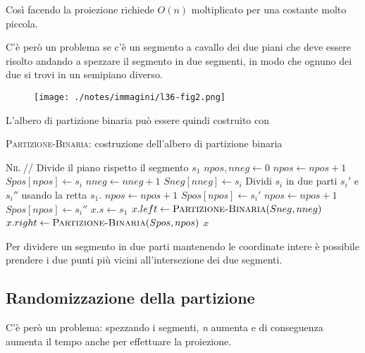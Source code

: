 Così facendo la proiezione richiede $O(n)$ moltiplicato per una costante molto piccola.

C'è però un problema se c'è un segmento a cavallo dei due piani che deve essere risolto andando a spezzare il segmento in due segmenti, in modo che ognuno dei due si trovi in un semipiano diverso.

\begin{figure}[htbp]
\centering
\texttt{[image: ./notes/immagini/l36-fig2.png]}
\end{figure}

L'albero di partizione binaria può essere quindi costruito con

\begin{breakablealgorithm}
	\caption{\textsc{Partizione-Binaria}: costruzione dell'albero di partizione binaria}
	\begin{algorithmic}[1]
        \State \Return \textsc{Nil}
    \EndIf
    \State // Divide il piano rispetto il segmento $s_1$
    \State $npos, nneg \gets 0$
            \State $npos \gets npos+1$
            \State $Spos[npos] \gets s_i$
            \State $nneg \gets nneg+1$
            \State $Sneg[nneg] \gets s_i$
        \Else
            \State Dividi $s_i$ in due parti $s_i'$ e $s_i''$ usando la retta $s_1$.
            \State $npos \gets npos+1$
            \State $Spos[npos] \gets s_i'$
            \State $npos \gets npos+1$
            \State $Spos[npos] \gets s_i''$
        \EndIf
    \EndFor
    \State $x.s \gets s_1$
    \State $x.left \gets \textsc{Partizione-Binaria}(Sneg, nneg)$
    \State $x.right \gets \textsc{Partizione-Binaria}(Spos, npos)$
    \State \Return $x$
\EndFunction
\end{algorithmic}
\end{breakablealgorithm}

Per dividere un segmento in due parti mantenendo le coordinate intere è possibile prendere i due punti più vicini all'intersezione dei due
segmenti.

\subsection{Randomizzazione della partizione}\label{randomizzazione-della-partizione}

C'è però un problema: spezzando i segmenti, \emph{n} aumenta e di conseguenza aumenta il tempo anche per effettuare la proiezione.

